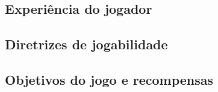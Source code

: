 \documentclass[12pt,a4paper]{article}
\begin{document}

\subsection{Experiência do jogador}


\subsection{Diretrizes de jogabilidade}


\subsection{Objetivos do jogo e recompensas}




\end{document}
